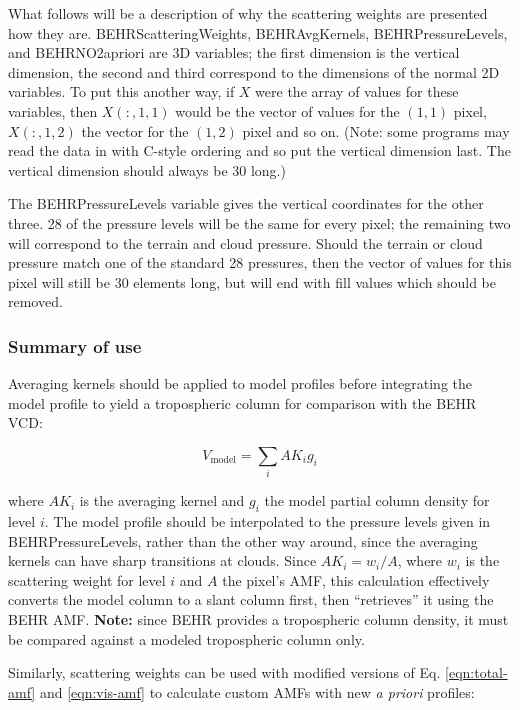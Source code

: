 \documentclass[12pt]{article}
\begin{document}
	What follows will be a description of why the scattering weights are presented how they are.  BEHRScatteringWeights, BEHRAvgKernels, BEHRPressureLevels, and BEHRNO2apriori are 3D variables; the first dimension is the vertical dimension, the second and third correspond to the dimensions of the normal 2D variables. To put this another way, if $X$ were the array of values for these variables, then $X(:,1,1)$ would be the vector of values for the $(1,1)$ pixel, $X(:,1,2)$ the vector for the $(1,2)$ pixel and so on. (Note: some programs may read the data in with C-style ordering and so put the vertical dimension last. The vertical dimension should always be 30 long.)
	
	The BEHRPressureLevels variable gives the vertical coordinates for the other three.  28 of the pressure levels will be the same for every pixel; the remaining two will correspond to the terrain and cloud pressure. Should the terrain or cloud pressure match one of the standard 28 pressures, then the vector of values for this pixel will still be 30 elements long, but will end with fill values which should be removed.
	
	\subsubsection{Summary of use}
	Averaging kernels should be applied to model profiles before integrating the model profile to yield a tropospheric column for comparison with the BEHR VCD:
	
	\begin{equation}
	V_{\mathrm{model}} = \sum_i AK_i g_i
	\end{equation}
	
	where $AK_i$ is the averaging kernel and $g_i$ the model  partial column density for level $i$. The model profile should be interpolated to the pressure levels given in BEHRPressureLevels, rather than the other way around, since the averaging kernels can have sharp transitions at clouds. Since $AK_i = w_i/A$, where $w_i$ is the scattering weight for level $i$ and $A$ the pixel's AMF, this calculation effectively converts the model column to a slant column first, then ``retrieves'' it using the BEHR AMF. \textbf{Note:} since BEHR provides a tropospheric  column density, it must be compared against a modeled tropospheric column only.
	
	Similarly, scattering weights can be used with modified versions of Eq. \eqref{eqn:total-amf} and \eqref{eqn:vis-amf} to calculate custom AMFs with new \emph{a priori} profiles:
	
\end{document}
